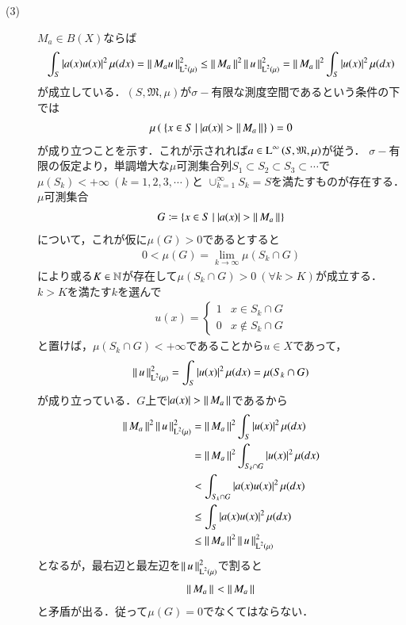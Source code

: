 \begin{prf}
\begin{description}
	\item[(3)] $M_a \in B(X)$ならば
		\begin{align}
			\int_{S} |a(x)u(x)|^2\, \mu(dx) 
			= \left\|\, M_au\, \right\|_{\operatorname{L}^{2} \left(\mu\right)}^2 \leq \left\|\, M_a\, \right\|_{}^2 \left\|\, u\, \right\|_{\operatorname{L}^{2} \left(\mu\right)}^2 
			= \left\|\, M_a\, \right\|_{}^2 \int_{S} |u(x)|^2\, \mu(dx)
		\end{align}
		が成立している．$(S, \mathfrak{M}, \mu)$が$\sigma-$有限な測度空間であるという条件の下では
		\begin{align}
			\mu\left(\ \{x \in S\ |\ |a(x)| > \left\|\, M_a\, \right\|_{}\}\ \right) = 0
		\end{align}
		が成り立つことを示す．これが示されれば$a \in \operatorname{L}^{\infty} \left(S, \mathfrak{M}, \mu\right)$が従う．
		$\sigma-$有限の仮定より，単調増大な$\mu$可測集合列$S_1 \subset S_2 \subset S_3 \subset \cdots$で$\mu(S_k) < +\infty\ (k=1,2,3,\cdots)$と
		$\cup_{k=1}^{\infty}S_k = S$を満たすものが存在する．
		$\mu$可測集合
		\begin{align}
			G \coloneqq \{x \in S\ |\ |a(x)| > \left\|\, M_a\, \right\|_{}\}
		\end{align}
		について，これが仮に$\mu(G) > 0$であるとすると
		\begin{align}
			0 < \mu(G) = \lim_{k \to \infty} \mu(S_k \cap G)
		\end{align}
		により或る$K \in \mathbb{N}$が存在して$\mu(S_k \cap G) > 0 \ (\forall k > K)$が成立する．$k > K$を満たす$k$を選んで
		\begin{align}
			u(x) = \begin{cases}
				1 & x \in S_k \cap G \\
				0 & x \notin S_k \cap G
			\end{cases}
		\end{align}
		と置けば，$\mu(S_k \cap G) < +\infty$であることから$u \in X$であって，
		\begin{align}
			\left\|\, u\, \right\|_{\operatorname{L}^{2} \left(\mu\right)}^2 = \int_{S} |u(x)|^2\, \mu(dx) = \mu(S_k \cap G)
		\end{align}
		が成り立っている．$G$上で$|a(x)| > \left\|\, M_a\, \right\|_{}$であるから
		\begin{align}
			\left\|\, M_a\, \right\|_{}^2 \left\|\, u\, \right\|_{\operatorname{L}^{2} \left(\mu\right)}^2 
			&= \left\|\, M_a\, \right\|_{}^2 \int_{S} |u(x)|^2\, \mu(dx) \\
			&= \left\|\, M_a\, \right\|_{}^2 \int_{S_k \cap G} |u(x)|^2\, \mu(dx) \\
			&< \int_{S_k \cap G} |a(x)u(x)|^2\, \mu(dx) \\
			&\leq \int_{S} |a(x)u(x)|^2\, \mu(dx) \\
			&\leq \left\|\, M_a\, \right\|_{}^2 \left\|\, u\, \right\|_{\operatorname{L}^{2} \left(\mu\right)}^2 
		\end{align}
		となるが，最右辺と最左辺を$\left\|\, u\, \right\|_{\operatorname{L}^{2} \left(\mu\right)}^2$で割ると
		\begin{align}
			\left\|\, M_a\, \right\|_{} < \left\|\, M_a\, \right\|_{}
		\end{align}
		と矛盾が出る．従って$\mu(G)=0$でなくてはならない．
		\QED
\end{description}
\end{prf}

